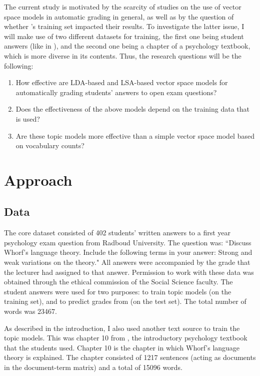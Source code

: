 \documentclass[a4paper,10pt,twoside]{article}
\begin{document}
The current study is motivated by the scarcity of studies on the use of vector space models in automatic grading in general, as well as by the question of whether 's training set impacted their results. To investigate the latter issue, I will make use of two different datasets for training, the first one being student answers (like in ), and the second one being a chapter of a psychology textbook, which is more diverse in its contents. Thus, the research questions will be the following:

\begin{enumerate}
\item How effective are LDA-based and LSA-based vector space models for automatically grading students' answers to open exam questions?
\item Does the effectiveness of the above models depend on the training data that is used?
\item Are these topic models more effective than a simple vector space model based on vocabulary counts?
\end{enumerate}

\section{Approach}

\subsection{Data}
The core dataset consisted of 402 students' written answers to a first year psychology exam question from Radboud University. The question was: ``Discuss Whorf's language theory. Include the following terms in your answer: Strong and weak variations on the theory." All answers were accompanied by the grade that the lecturer had assigned to that answer. Permission to work with these data was obtained through the ethical commission of the Social Science faculty. The student answers were used for two purposes: to train topic models (on the training set), and to predict grades from (on the test set). The total number of words was 23467.

As described in the introduction, I also used another text source to train the topic models. This was chapter 10 from , the introductory psychology textbook that the students used. Chapter 10 is the chapter in which Whorf's language theory is explained. The chapter consisted of 1217 sentences (acting as documents in the document-term matrix) and a total of 15096 words.
\end{document}
